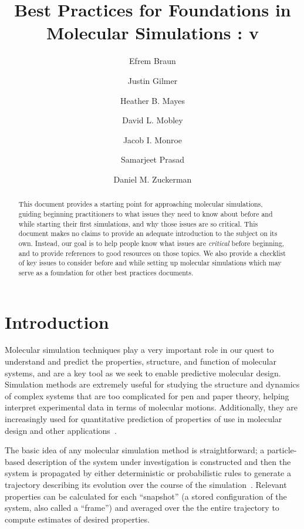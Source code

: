 \documentclass[9pt,bestpractices]{livecoms}
\title{Best Practices for Foundations in Molecular Simulations : v\versionnumber}
\author[1]{Efrem Braun}
\author[2]{Justin Gilmer}
\author[3]{Heather B. Mayes}
\author[4]{David L. Mobley}
\author[5]{Jacob I. Monroe}
\author[6]{Samarjeet Prasad}
\author[7]{Daniel M. Zuckerman}
\affil[1]{University of California, Berkeley}
\affil[2]{Vanderbilt University}
\affil[3]{University of Michigan, Ann Arbor}
\affil[4]{University of California, Irvine}
\affil[5]{University of California, Santa Barbara}
\affil[6]{National Institutes of Health}
\affil[7]{Oregon Health and Science University}
\begin{document}
\begin{frontmatter}
\maketitle

\begin{abstract}
This document provides a starting point for approaching molecular simulations, guiding beginning practitioners to what issues they need to know about before and while starting their first simulations, and why those issues are so critical. 
This document makes no claims to provide an adequate introduction to the subject on its own. 
Instead, our goal is to help people know what issues are \emph{critical} before beginning, and to provide references to good resources on those topics. 
We also provide a checklist of key issues to consider before and while setting up molecular simulations which may serve as a foundation for other best practices documents.
\end{abstract}
\end{frontmatter}


\todototoc
\listoftodos

\section{Introduction}
\label{sec:intro}

Molecular simulation techniques play a very important role in our quest to understand and predict the properties, structure, and function of molecular systems, and are a key tool as we seek to enable predictive molecular design.
Simulation methods are extremely useful for studying the structure and dynamics of complex systems that are too complicated for pen and paper theory, helping interpret experimental data in terms of molecular motions.
Additionally, they are increasingly used for quantitative prediction of properties of use in molecular design and other applications~\cite{Nussinov2014,Towns2014,Kirchmair2015,Sresht2017,Bottaro2018}.

The basic idea of any molecular simulation method is straightforward; a particle-based description of the system under investigation is constructed and then the system is propagated by either deterministic or probabilistic rules to generate a trajectory describing its evolution over the course of the simulation~\cite{Frenkel:2001:,LeachBook}.
Relevant properties can be calculated for each ``snapshot'' (a stored configuration of the system, also called a ``frame'') and averaged over the the entire trajectory to compute estimates of desired properties.
\end{document}

